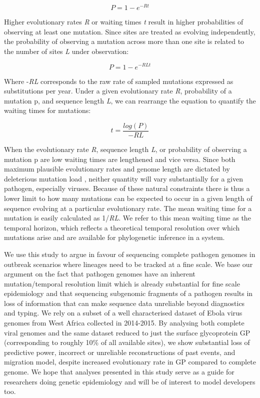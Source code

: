 \documentclass[11pt,oneside,letterpaper]{article}
\begin{document}
\begin{equation}
  P = 1-e^{-Rt}
\end{equation}

Higher evolutionary rates \textit{R} or waiting times \textit{t} result in higher probabilities of observing at least one mutation. Since sites are treated as evolving independently, the probability of observing a mutation across more than one site is related to the number of sites \textit{L} under observation:

\begin{equation}
  P = 1-e^{-RLt}
\end{equation}

Where -\textit{RL} corresponds to the raw rate of sampled mutations expressed as substitutions per year. Under a given evolutionary rate \textit{R}, probability of a mutation p, and sequence length \textit{L}, we can rearrange the equation to quantify the waiting times for mutations:

\begin{equation}
  t = \frac{log(P)}{-RL}
\end{equation}

When the evolutionary rate \textit{R}, sequence length \textit{L}, or probability of observing a mutation p are low waiting times are lengthened and vice versa.
Since both maximum plausible evolutionary rates and genome length are dictated by deleterious mutation load \citep{gago_extremely_2009}, neither quantity will vary substantially for a given pathogen, especially viruses.
Because of these natural constraints there is thus a lower limit to how many mutations can be expected to occur in a given length of sequence evolving at a particular evolutionary rate.
The mean waiting time for a mutation is easily calculated as 1/\textit{RL}.
We refer to this mean waiting time as the temporal horizon, which reflects a theoretical temporal resolution over which mutations arise and are available for phylogenetic inference in a system.

We use this study to argue in favour of sequencing complete pathogen genomes in outbreak scenarios where lineages need to be tracked at a fine scale.
We base our argument on the fact that pathogen genomes have an inherent mutation/temporal resolution limit which is already substantial for fine scale epidemiology and that sequencing subgenomic fragments of a pathogen results in loss of information that can make sequence data unreliable beyond diagnostics and typing.
We rely on a subset of a well characterised \citep{dudas_virus_2017} dataset of Ebola virus genomes from West Africa collected in 2014-2015.
By analysing both complete viral genomes and the same dataset reduced to just the surface glycoprotein GP (corresponding to roughly 10\% of all available sites), we show substantial loss of predictive power, incorrect or unreliable reconstructions of past events, and migration model, despite increased evolutionary rate in GP compared to complete genome.
We hope that analyses presented in this study serve as a guide for researchers doing genetic epidemiology and will be of interest to model developers too.
\end{document}
